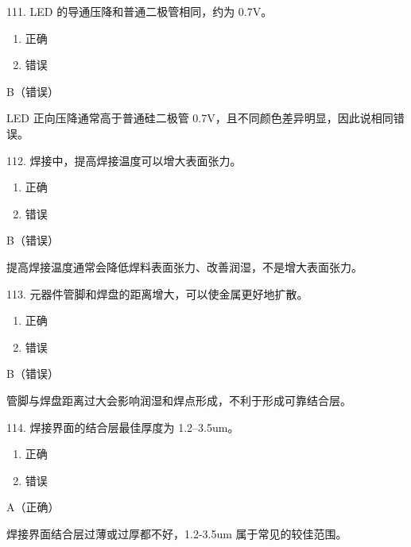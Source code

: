 \begin{question}{111. LED 的导通压降和普通二极管相同，约为 0.7V。}
\begin{enumerate}[label=\Alph*., leftmargin=2.4em, itemsep=0.2em]
\item 正确
\item 错误
\end{enumerate}
\end{question}
\begin{answer}
B（错误）
\end{answer}
\begin{explanation}
LED 正向压降通常高于普通硅二极管 0.7V，且不同颜色差异明显，因此说相同错误。
\end{explanation}

\begin{question}{112. 焊接中，提高焊接温度可以增大表面张力。}
\begin{enumerate}[label=\Alph*., leftmargin=2.4em, itemsep=0.2em]
\item 正确
\item 错误
\end{enumerate}
\end{question}
\begin{answer}
B（错误）
\end{answer}
\begin{explanation}
提高焊接温度通常会降低焊料表面张力、改善润湿，不是增大表面张力。
\end{explanation}

\begin{question}{113. 元器件管脚和焊盘的距离增大，可以使金属更好地扩散。}
\begin{enumerate}[label=\Alph*., leftmargin=2.4em, itemsep=0.2em]
\item 正确
\item 错误
\end{enumerate}
\end{question}
\begin{answer}
B（错误）
\end{answer}
\begin{explanation}
管脚与焊盘距离过大会影响润湿和焊点形成，不利于形成可靠结合层。
\end{explanation}

\begin{question}{114. 焊接界面的结合层最佳厚度为 1.2–3.5um。}
\begin{enumerate}[label=\Alph*., leftmargin=2.4em, itemsep=0.2em]
\item 正确
\item 错误
\end{enumerate}
\end{question}
\begin{answer}
A（正确）
\end{answer}
\begin{explanation}
焊接界面结合层过薄或过厚都不好，1.2-3.5um 属于常见的较佳范围。
\end{explanation}


